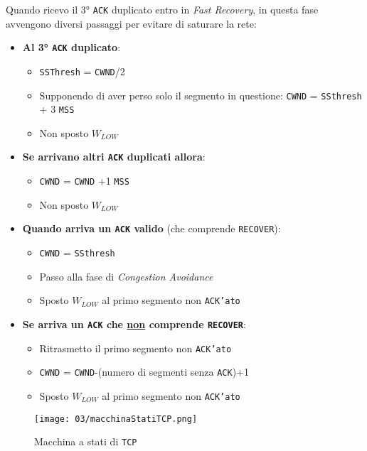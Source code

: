             Quando ricevo il 3° \texttt{ACK} duplicato entro in \textit{Fast Recovery}, in questa fase avvengono diversi passaggi per evitare di saturare la rete: \begin{itemize}
                \item \textbf{Al 3° \texttt{ACK} duplicato}:\begin{itemize}
                    \item \texttt{SSThresh} = \texttt{CWND}/2
                    \item Supponendo di aver perso solo il segmento in questione: \texttt{CWND} = \texttt{SSthresh} + 3 \texttt{MSS}
                    \item Non sposto $W_{LOW}$
                \end{itemize}
                \item \textbf{Se arrivano altri \texttt{ACK} duplicati allora}: \begin{itemize}
                    \item \texttt{CWND} = \texttt{CWND} +1 \texttt{MSS}
                    \item Non sposto $W_{LOW}$
                \end{itemize}
                \item \textbf{Quando arriva un \texttt{ACK} valido} (che comprende \texttt{RECOVER}): \begin{itemize}
                    \item \texttt{CWND} = \texttt{SSthresh}
                    \item Passo alla fase di \textit{Congestion Avoidance}
                    \item Sposto $W_{LOW}$ al primo segmento non \texttt{ACK'ato}
                \end{itemize}
                \item \textbf{Se arriva un \texttt{ACK} che \underline{non} comprende \texttt{RECOVER}}:\begin{itemize}
                    \item Ritrasmetto il primo segmento non \texttt{ACK'ato}
                    \item \texttt{CWND} = \texttt{CWND}-(numero di segmenti senza \texttt{ACK})+1
                    \item Sposto $W_{LOW}$ al primo segmento non \texttt{ACK'ato}
                \end{itemize}
            \end{itemize}
            \begin{figure}[H]
                \centering
                \texttt{[image: 03/macchinaStatiTCP.png]}
                \caption{Macchina a stati di \texttt{TCP}}
            \end{figure}
